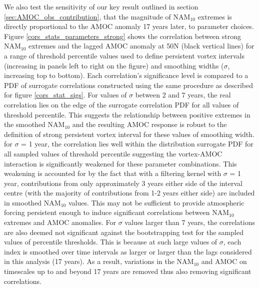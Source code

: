 We also test the sensitivity of our key result outlined in section \ref{sec:AMOC_obs_contribution}, that the magnitude of NAM$_{10}$ extremes is directly proportional to the AMOC anomaly 17 years later, to parameter choices. Figure \ref{cors_stats_parameters_strong} shows the correlation between strong NAM$_{10}$ extremes and the lagged AMOC anomaly at 50N (black vertical lines) for a range of threshold percentile values used to define persistent vortex intervals (increasing in panels left to right on the figure) and smoothing widths ($\sigma$, increasing top to bottom). Each correlation's significance level is compared to a PDF of surrogate correlations constructed using the same procedure as described for figure \ref{cors_stat_sigs}. For values of $\sigma$ between 2 and 7 years, the real correlation lies on the edge of the surrogate correlation PDF for all values of threshold percentile. This suggests the relationship between positive extremes in the smoothed NAM$_{10}$ and the resulting AMOC response is robust to the definition of strong persistent vortex interval for these values of smoothing width. for $\sigma$ = 1 year, the correlation lies well within the distribution surrogate PDF for all sampled values of threshold percentile suggesting the vortex-AMOC interaction is significantly weakened for these parameter combinations. This weakening is accounted for by the fact that with a filtering kernel with $\sigma$ = 1 year, contributions from only approximately 3 years either side of the interval centre (with the majority of contributions from 1-2 years either side) are included in smoothed NAM$_{10}$ values. This may not be sufficient to provide atmospheric forcing persistent enough to induce significant correlations between NAM$_{10}$ extremes and AMOC anomalies. For $\sigma$ values larger than 7 years, the correlations are also deemed not significant against the bootstrapping test for the sampled values of percentile thresholds. This is because at such large values of $\sigma$, each index is smoothed over time intervals as larger or larger than the lags considered in this analysis (17 years). As a result, variations in the NAM$_{10}$ and AMOC on timescales up to and beyond 17 years are removed thus also removing significant correlations.

